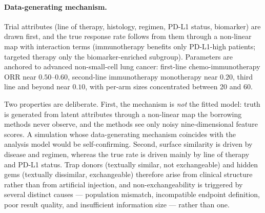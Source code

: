 \documentclass[11pt]{article}
\begin{document}
\paragraph{Data-generating mechanism.} Trial attributes (line of therapy,
histology, regimen, PD-L1 status, biomarker) are drawn first, and the true
response rate follows from them through a non-linear map with interaction terms
(immunotherapy benefits only PD-L1-high patients; targeted therapy only the
biomarker-enriched subgroup). Parameters are anchored to advanced non-small-cell
lung cancer: first-line chemo-immunotherapy ORR near $0.50$--$0.60$, second-line
immunotherapy monotherapy near $0.20$, third line and beyond near $0.10$, with
per-arm sizes concentrated between 20 and 60.

Two properties are deliberate. First, the mechanism is \emph{not} the fitted
model: truth is generated from latent attributes through a non-linear map the
borrowing methods never observe, and the methods see only noisy nine-dimensional
feature scores. A simulation whose data-generating mechanism coincides with the
analysis model would be self-confirming. Second, surface similarity is driven by
disease and regimen, whereas the true rate is driven mainly by line of therapy
and PD-L1 status. Trap donors (textually similar, not exchangeable) and hidden
gems (textually dissimilar, exchangeable) therefore arise from clinical
structure rather than from artificial injection, and non-exchangeability is
triggered by several distinct causes --- population mismatch, incompatible
endpoint definition, poor result quality, and insufficient information size ---
rather than one.
\end{document}
